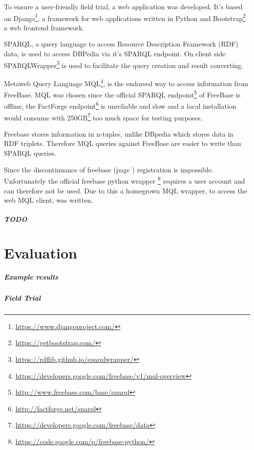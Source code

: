 \documentclass[11pt,titlepage,oneside,openany]{book}
\begin{document}
To ensure a user-friendly field trial, a web application was developed. It's based on 
Django\footnote{\url{https://www.djangoproject.com/}}, a framework for web applications written in Python and Bootstrap\footnote{\url{https://getbootstrap.com/}} a web frontend framework.

SPARQL, a query language to access Resource Description Framework (RDF) data, is used to access DBPedia via it's SPARQL endpoint. On client side SPARQLWrapper\footnote{\url{https://rdflib.github.io/sparqlwrapper/}} is used to facilitate the query creation and result converting. 


Metaweb Query Language MQL\footnote{\url{https://developers.google.com/freebase/v1/mql-overview}}, is the endorsed way to access information from FreeBase. MQL was chosen since the official SPARQL endpoint\footnote{\url{http://www.freebase.com/base/sparql}} of FreeBase is offline, the FactForge endpoint\footnote{\url{http://factforge.net/sparql}} is unreliable and slow and a local installation would consume with 250GB\footnote{\url{https://developers.google.com/freebase/data}} too much space for testing purposes.

Freebase stores information in n-tuples, unlike DBpedia which stores data in RDF triplets. Therefore MQL queries against FreeBase are easier to write than SPARQL queries.


Since the discontinuance of freebase (page \pageref{prob:freebase}) registration is impossible. Unfortunately the official freebase python wrapper \footnote{\url{https://code.google.com/p/freebase-python/}} requires a user account and can therefore not be used. Due to this a homegrown MQL wrapper, to access the web MQL client, was written.



  \paragraph{TODO}
\label{sec:TODO}


\chapter{Evaluation}
\label{cha:evaluation}

\paragraph{Example results}
\label{cha:example}

\paragraph{Field Trial}
\label{cha:example}
\end{document}
